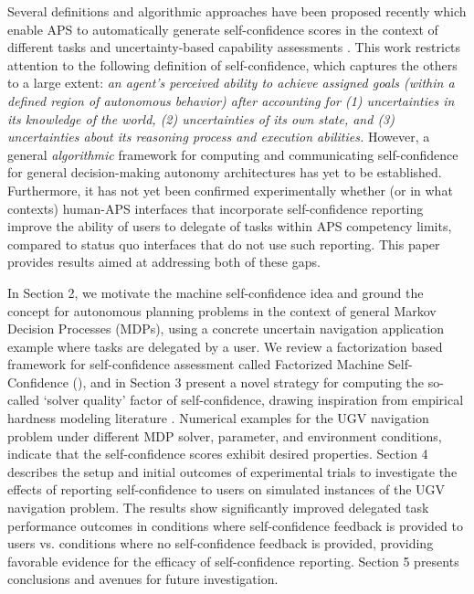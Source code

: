 Several definitions and algorithmic approaches have been proposed recently which enable APS to automatically generate self-confidence scores in the context of different tasks and uncertainty-based capability assessments \cite{Sweet2016-tz, Israelsen2019-to}. This work restricts attention to the following definition of self-confidence, which captures the others to a large extent: \textit{an agent's perceived ability to achieve assigned goals (within a defined region of autonomous behavior) after accounting for (1) uncertainties in its knowledge of the world, (2) uncertainties of its own state, and (3) uncertainties about its reasoning process and execution abilities.} However, a general \emph{algorithmic} framework for computing and communicating self-confidence for general decision-making autonomy architectures has yet to be established. Furthermore, it has not yet been confirmed experimentally whether (or in what contexts) human-APS interfaces that incorporate self-confidence reporting improve the ability of users to delegate of tasks within APS competency limits, compared to status quo interfaces that do not use such reporting. This paper provides results aimed at addressing both of these gaps. 


In Section 2, we motivate the machine self-confidence idea and ground the concept for autonomous planning problems in the context of general Markov Decision Processes (MDPs), using a concrete uncertain navigation application example where tasks are delegated by a user. We review a factorization based framework for self-confidence assessment called Factorized Machine Self-Confidence (\famsec), and in Section 3 present a novel strategy for computing the so-called `solver quality' factor of self-confidence, drawing inspiration from empirical hardness modeling literature \cite{Leyton-Brown2009-yr}. Numerical examples for the UGV navigation problem under different MDP solver, parameter, and environment conditions, indicate that the self-confidence scores exhibit desired properties. Section 4 describes the setup and initial outcomes of experimental trials to investigate the effects of reporting self-confidence to users on simulated instances of the UGV navigation problem. The results show significantly improved delegated task performance outcomes in conditions where self-confidence feedback is provided to users vs. conditions where no self-confidence feedback is provided, providing favorable evidence for the efficacy of self-confidence reporting. Section 5 presents conclusions and avenues for future investigation. %


